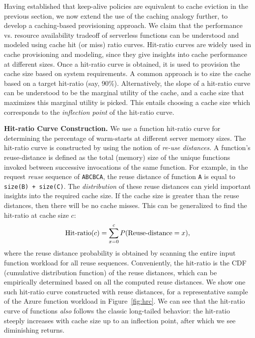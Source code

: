 Having established that keep-alive policies are equivalent to cache eviction in the previous section, we now extend the use of the caching analogy further, to develop a caching-based provisioning approach. 
We claim that the performance vs. resource availability tradeoff of serverless functions can be understood and modeled using cache hit (or miss) ratio curves.
%
Hit-ratio curves are widely used in cache provisioning and modeling, since they give insights into cache performance at different sizes. 
Once a hit-ratio curve is obtained, it is used to provision the cache size based on system requirements. 
A common approach is to size the cache based on a target hit-ratio (say, 90\%). 
Alternatively, the slope of a hit-ratio curve can be understood to be the marginal utility of the cache, and a cache size that maximizes this marginal utility is picked.
This entails choosing a cache size which corresponds to the \emph{inflection point} of the hit-ratio curve. 


\noindent \textbf{Hit-ratio Curve Construction.}
We use a function hit-ratio curve for determining the percentage of warm-starts at different server memory sizes. 
The hit-ratio curve is constructed by using the notion of \emph{re-use distances.}
A function's reuse-distance is defined as the total (memory) size of the unique functions invoked between successive invocations of the same function.
For example, in the request \emph{reuse} sequence of \texttt{ABCBCA}, the reuse distance of function \texttt{A} is equal to \texttt{size(B) + size(C)}.
%
The \emph{distribution} of these reuse distances can yield important insights into the required cache size.
If the cache size is greater than the reuse distances, then there will be no cache misses. 
This can be generalized to find the hit-ratio at cache size $c$:   \vspace*{-5pt}
\begin{equation}
  \label{eq:hrc-rdd}
  \text{Hit-ratio}(c) = \sum_{x=0}^cP(\text{Reuse-distance} = x),
    \vspace*{-5pt}
\end{equation}
where the reuse distance probability is obtained by scanning the entire input function workload for all reuse sequences. 
Conveniently, the hit-ratio is the CDF (cumulative distribution function) of the reuse distances, which can be empirically determined based on all the computed reuse distances. 
We show one such hit-ratio curve constructed with reuse distances, for a representative sample of the Azure function workload in Figure~\ref{fig:hrc}. 
We can see that the hit-ratio curve of functions \emph{also} follows the classic long-tailed behavior: the hit-ratio steeply increases with cache size up to an inflection point, after which we see diminishing returns. 


